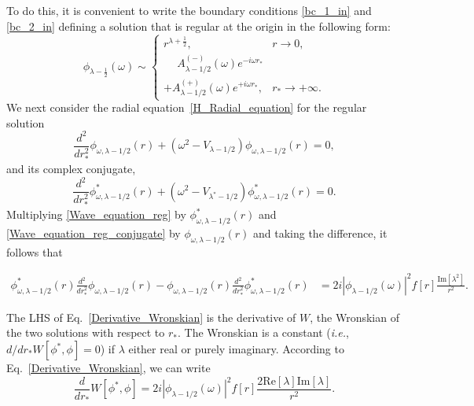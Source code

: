 \documentclass[aps,prd,longbibliography,reprint,twocolumn,amsmath,amssymb,amsfonts,showpacs,footnote,superscriptaddress]{revtex4-1}%
\begin{document}
To do this, it is convenient to write the boundary conditions \eqref{bc_1_in} and \eqref{bc_2_in} defining a solution that is regular at the origin in the following form:
\begin{equation}
\label{bc_CAM}
\phi_{\lambda-\frac{1}{2}}(\omega) \sim
\begin{cases}
r^{\lambda+\frac{1}{2}}, &
r \rightarrow 0, \\
\phantom{+} A_{\lambda-1/2}^{(-)}(\omega) e^{-i\omega r_*} & \\ 
 + A_{\lambda-1/2}^{(+)}(\omega) e^{+i\omega r_*} , &r_* \rightarrow +\infty.
\end{cases}
\end{equation}
%
We next consider the radial equation~\eqref{H_Radial_equation} for the regular solution
\begin{equation}\label{Wave_equation_reg}
   \frac{d^2}{dr_*^2}\phi_{\omega,\lambda-1/2}(r)+\left(\omega^2 -V_{\lambda-1/2}\right) \phi_{\omega,\lambda-1/2}(r) =0,
 \end{equation}
and its complex conjugate, 
 \begin{equation}\label{Wave_equation_reg_conjugate}
   \frac{d^2}{dr_*^2}\phi^*_{\omega,\lambda-1/2}(r)+ \left(\omega^2 -V_{\lambda^*-1/2}\right)\phi^*_{\omega,{\lambda-1/2}}(r) = 0 .
 \end{equation}
Multiplying \eqref{Wave_equation_reg} by $\phi^*_{\omega,\lambda-1/2}(r)$ and \eqref{Wave_equation_reg_conjugate} by $\phi_{\omega,\lambda-1/2}(r)$ and taking the difference, it follows that
\begin{widetext}
\begin{equation}\label{Derivative_Wronskian}
\begin{aligned}
 \phi^*_{\omega,\lambda-1/2}(r) \frac{d^2}{dr_*^2}\phi_{\omega,\lambda-1/2}(r) - \phi_{\omega,\lambda-1/2}(r) \frac{d^2}{dr_*^2} \phi^*_{\omega,\lambda-1/2}(r) %
                           &= 2 i|\phi_{\lambda-1/2}(\omega)|^2 f[r]\frac{\text{Im}[\lambda^2]}{r^2} .
 \end{aligned}
\end{equation}
\end{widetext}
The LHS of Eq.~\eqref{Derivative_Wronskian} is the derivative of $W$, the Wronskian of the two solutions with respect to $r_*$. The Wronskian is a constant (\textit{i.e.}, $d/dr_* W[\phi^*,\phi] = 0$) if $\lambda$ either real or purely imaginary. According to Eq.~\eqref{Derivative_Wronskian}, we can write
\begin{equation}\label{Derivative_Wronskian_bis}
\frac{d}{dr_*}W[\phi^*,\phi]= 2i|\phi_{\lambda-1/2}(\omega)|^2 f[r]\frac{2\text{Re}[\lambda]\text{Im}[\lambda]}{r^2}.
\end{equation}
\end{document}
